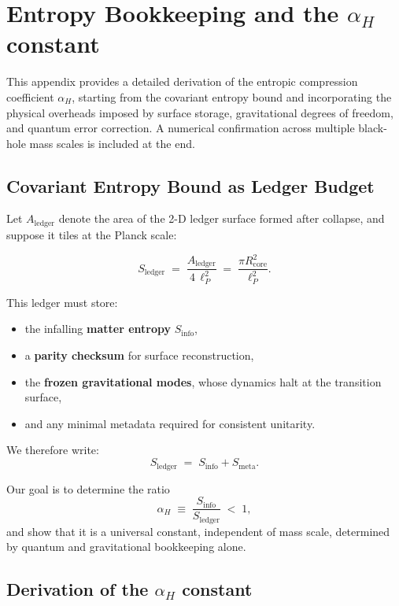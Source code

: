 \documentclass[a4paper, 12pt, oneside]{book}
\numberwithin{equation}{chapter}
\begin{document}
\chapter{Entropy Bookkeeping and the \texorpdfstring{$\alpha_H$}{alphaH} constant}
\label{app:AlphaH}

\noindent
This appendix provides a detailed derivation of the entropic compression coefficient
$\alpha_H$, starting from the covariant entropy bound and incorporating
the physical overheads imposed by surface storage, gravitational degrees
of freedom, and quantum error correction.  A numerical confirmation across
multiple black-hole mass scales is included at the end.

\section{Covariant Entropy Bound as Ledger Budget}
\label{app:CEB}

Let $A_\text{ledger}$ denote the area of the 2-D ledger surface formed
after collapse, and suppose it tiles at the Planck scale:

\[
    S_\text{ledger}
    \;=\;\frac{A_\text{ledger}}{4\,\ell_P^2}
    \;=\;\frac{\pi R_{\text{core}}^2}{\ell_P^2}.
\]

This ledger must store:
\begin{itemize}
  \item the infalling \textbf{matter entropy} $S_{\text{info}}$,
  \item a \textbf{parity checksum} for surface reconstruction,
  \item the \textbf{frozen gravitational modes}, whose dynamics halt
        at the transition surface,
  \item and any minimal metadata required for consistent unitarity.
\end{itemize}

We therefore write:
\[
    S_{\text{ledger}} \;=\; S_{\text{info}} + S_{\text{meta}}.
\]

Our goal is to determine the ratio
\[
    \alpha_H \;\equiv\; \frac{S_{\text{info}}}{S_{\text{ledger}}}
                      \;<\; 1,
\]
and show that it is a universal constant, independent of mass scale,
determined by quantum and gravitational bookkeeping alone.

\section{Derivation of the \texorpdfstring{$\alpha_H$}{alphaH} constant}
\label{app:AlphaH_Origin}
\end{document}

